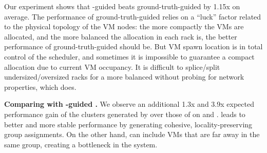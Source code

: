 
Our experiment shows that \marcopolo-guided \mlha beats ground-truth-guided \mlha by 1.15x on average. The performance of ground-truth-guided \mlha relies on a ``luck'' factor related to the physical topology of the VM nodes: the more compactly the VMs are allocated, and the more balanced the allocation in each rack is, the better performance of ground-truth-guided \mlha should be. But VM spawn location is in total control of the scheduler, and sometimes it is impossible to guarantee a compact allocation due to current VM occupancy. It is difficult to splice/split undersized/oversized racks for a more balanced \mlha without probing for network properties, which \marcopolo{} does.



\noindent\textbf{Comparing with \strongrandom-guided \mlha.}
We observe an additional 1.3x and 3.9x expected performance gain of the clusters generated by \marcopolo{} over those of \strongrandom{} on \azure and \ectwo. \marcopolo{} leads to  better and more stable performance by generating cohesive, locality-preserving group assignments. On the other hand, \strongrandom can include VMs that are far away in the same group, creating a bottleneck in the system. %

